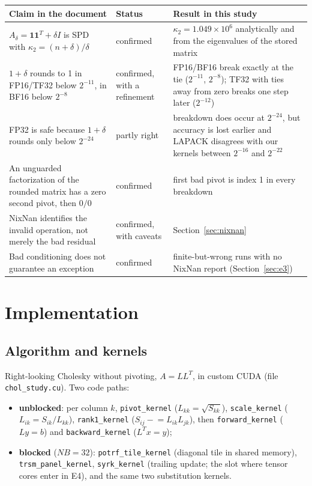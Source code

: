 \documentclass[11pt,a4paper]{article}
\begin{document}
\begin{table}[h]
\centering\small
\begin{tabular}{p{5.1cm}p{1.9cm}p{7.2cm}}
\toprule
Claim in the document & Status & Result in this study\\
\midrule
$A_\delta=\mathbf{1}\mathbf{1}^T+\delta I$ is SPD with $\kappa_2=(n+\delta)/\delta$ & confirmed & $\kappa_2=1.049\times10^6$ analytically and from the eigenvalues of the stored matrix\\
$1+\delta$ rounds to 1 in FP16/TF32 below $2^{-11}$, in BF16 below $2^{-8}$ & confirmed, with a refinement & FP16/BF16 break exactly at the tie ($2^{-11}$, $2^{-8}$); TF32 with ties away from zero breaks one step later ($2^{-12}$)\\
FP32 is safe because $1+\delta$ rounds only below $2^{-24}$ & partly right & breakdown does occur at $2^{-24}$, but accuracy is lost earlier and LAPACK disagrees with our kernels between $2^{-16}$ and $2^{-22}$\\
An unguarded factorization of the rounded matrix has a zero second pivot, then $0/0$ & confirmed & first bad pivot is index 1 in every breakdown\\
NixNan identifies the invalid operation, not merely the bad residual & confirmed, with caveats & Section~\ref{sec:nixnan}\\
Bad conditioning does not guarantee an exception & confirmed & finite-but-wrong runs with no NixNan report (Section~\ref{sec:e3})\\
\bottomrule
\end{tabular}
\end{table}

\section{Implementation}

\subsection{Algorithm and kernels}

Right-looking Cholesky without pivoting, $A=LL^T$, in custom CUDA (file \texttt{chol\_study.cu}). Two code paths:

\begin{itemize}
  \item \textbf{unblocked}: per column $k$, \texttt{pivot\_kernel} ($L_{kk}=\sqrt{S_{kk}}$), \texttt{scale\_kernel} ($L_{ik}=S_{ik}/L_{kk}$), \texttt{rank1\_kernel}
  ($S_{ij}\mathrel{-}=L_{ik}L_{jk}$), then \texttt{forward\_kernel} ($Ly=b$) and \texttt{backward\_kernel} ($L^Tx=y$);
  \item \textbf{blocked} ($NB=32$): \texttt{potrf\_tile\_kernel} (diagonal tile in shared memory), \texttt{trsm\_panel\_kernel}, \texttt{syrk\_kernel}
  (trailing update; the slot where tensor cores enter in E4), and the same two substitution kernels.
\end{itemize}
\end{document}
